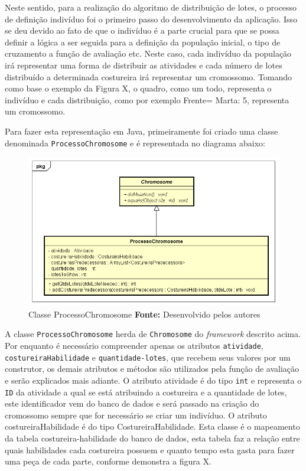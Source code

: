 \par Neste sentido, para a realização do algoritmo de distribuição de lotes, o processo de definição indivíduo
foi o primeiro passo do desenvolvimento da aplicação. Isso se deu devido ao fato de que o indivíduo é a parte 
crucial para que se possa definir a lógica a ser seguida para a definição da população inicial, o tipo de cruzamento 
a função de avaliação etc. Neste caso, cada indivíduo da população irá representar uma forma de distribuir as atividades e
cada número de lotes distribuído a determinada costureira irá representar um cromossomo. Tomando como base o exemplo da 
Figura X, o quadro, como um todo, representa o indivíduo e cada distribuição, como por exemplo Frente= Marta: 5, representa 
um cromossomo.

\par Para fazer esta representação em Java, primeiramente foi criado uma classe denominada \texttt{ProcessoChromosome} e
é representada no diagrama abaixo:

\begin{figure}[h!]
	\centerline{\includegraphics[scale=0.6]{./imagens/processo_chromosome_diagram.png}}
	\caption[ProcessoChromosome Class]
	{Classe ProcessoChromosome \textbf{Fonte:} Desenvolvido pelos autores}
	\label{fig:exemplo1}
\end{figure}


\par A classe \texttt{ProcessoChromosome} herda de \texttt{Chromosome} do \textit{framework} descrito acima. Por enquanto
é necessário compreender apenas os atributos \texttt{atividade}, \texttt{costureiraHabilidade} e \texttt{quantidade-lotes}, 
que recebem seus valores por um construtor, os demais atributos e métodos são utilizados pela função de avaliação e serão 
explicados mais adiante. O atributo atividade é do tipo \texttt{int} e representa o \texttt{ID} da atividade a qual se está
atribuindo a costureira e a quantidade de lotes, este identificador vem do banco de dados e será passado na criação do cromossomo
sempre que for necessário se criar um indivíduo. O atributo costureiraHabilidade é do tipo CostureiraHabilidade. Esta classe
é o mapeamento da tabela costureira-habilidade do banco de dados, esta tabela faz a relação entre quais habilidades cada costureira
possuem e quanto tempo esta gasta para fazer uma peça de cada parte, conforme demonstra a figura X.


